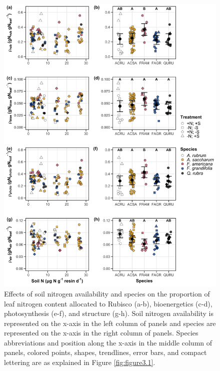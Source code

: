 \newpage
\begin{figure}
    \includegraphics[scale = 0.60]{ch3_NxpH/figs/NxS_fig3_leafn_allocation.png}
    \centering
    \caption[Effects of soil N availability, species, and leaf N content on the fraction of leaf nitrogen allocated to photosynthesis and structure]{Effects of soil nitrogen availability and species on the proportion of leaf nitrogen content allocated to Rubisco (a-b), bioenergetics (c-d), photosynthesis (e-f), and structure (g-h). Soil nitrogen availability is represented on the x-axis in the left column of panels and species are represented on the x-axis in the right column of panels. Species abbreviations and position along the x-axis in the middle column of panels, colored points, shapes, trendlines, error bars, and compact lettering are as explained in Figure \ref{fig:figure3.1}.}
    \label{fig:figure3.3}
    \end{figure}
\clearpage

\newpage
